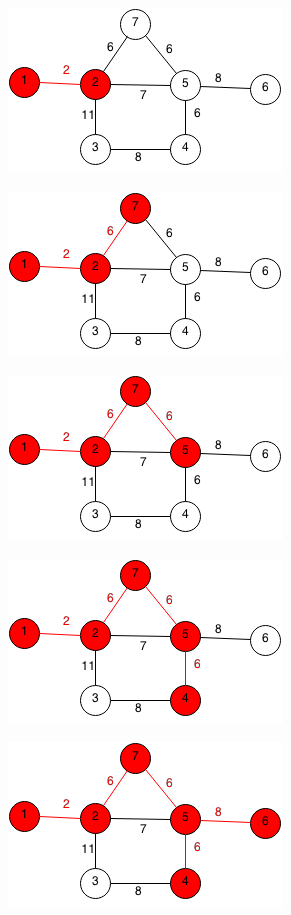 \documentclass[11pt,oneside]{book}
\makeatletter
\def\maxwidth#1{\ifdim\Gin@nat@width>#1 #1\else\Gin@nat@width\fi}
\makeatother
\begin{document}
\vspace{5px}\includegraphics[width=\maxwidth{\textwidth}]{prim2.png}

\vspace{5px}\includegraphics[width=\maxwidth{\textwidth}]{prim3.png}

\vspace{5px}\includegraphics[width=\maxwidth{\textwidth}]{prim4.png}

\vspace{5px}\includegraphics[width=\maxwidth{\textwidth}]{prim5.png}

\vspace{5px}\includegraphics[width=\maxwidth{\textwidth}]{prim6.png}
\end{document}
